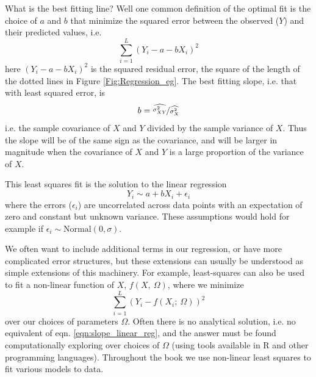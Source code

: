 What
is the best fitting line? Well one common definition of the optimal fit is
the choice of $a$ and $b$ that minimize the squared error
between the observed ($Y$) and their predicted values, i.e.
\begin{equation}
\sum_{i=1}^L  (Y_i  - a -  b X_i )^2
\end{equation}
here $(Y_i  - a -  b X_i)^2$ is the squared residual error, the square
of the length of the dotted lines in Figure
\ref{Fig:Regression_eg}. The best fitting slope, i.e. that with least
squared error, is
\begin{equation}
b = \nicefrac{ \widehat{\sigma_{XY}^2}}{ \widehat{\sigma_{X}^2}} \label{eqn:slope_linear_reg}
\end{equation}
i.e. the sample covariance of $X$ and $Y$ divided by the sample
variance of $X$. Thus the slope will be of the same sign as the
covariance, and will be larger in magnitude when the covariance of $X$
and $Y$ is a large proportion of the variance of $X$.

This least squares fit is the solution to the linear regression
\begin{equation}
Y_i \sim a+ b X_i + \epsilon_i  
\end{equation}
where the errors ($\epsilon_i$) are uncorrelated across data points
with an expectation of zero and constant but unknown variance. These
assumptions would hold for example if $\epsilon_i \sim \textrm{Normal}(0,\sigma)$.


We often want to include additional terms in our regression, or have
more complicated error structures, but these
extensions can usually be understood as simple extensions of this
machinery. For example, least-squares can also be used to fit a non-linear
function of $X$, $f(X,~\Omega)$, 
where we minimize 
\begin{equation}
\sum_{i=1}^L  (Y_i  -f(X_i; ~\Omega ))^2
\end{equation}
over our choices of parameters $\Omega$. Often there is no analytical
solution, i.e. no equivalent of eqn. \ref{eqn:slope_linear_reg}, and
the answer must be found computationally exploring over choices of
$\Omega$ (using tools available in
R and other programming languages). Throughout the book we use
non-linear least squares to fit various models to data.


